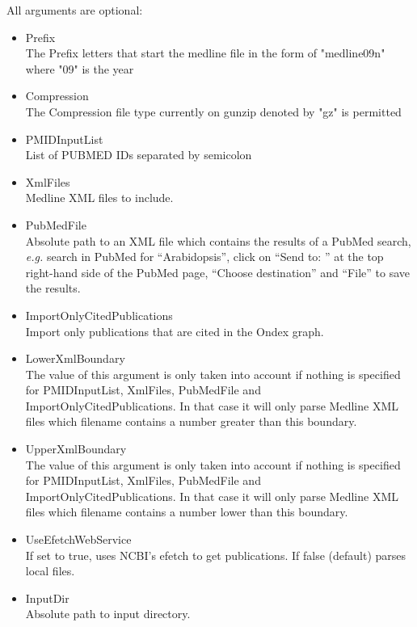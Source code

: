 All arguments are optional:
\begin{itemize}
  \item{Prefix}\\
  The Prefix letters that start the medline file in the form of "medline09n" where "09" is the year
  \item{Compression}\\
  The Compression file type currently on gunzip denoted by "gz" is permitted
  \item{PMIDInputList}\\
  List of PUBMED IDs separated by semicolon
  \item{XmlFiles}\\
  Medline XML files to include.
  \item{PubMedFile}\\
  Absolute path to an XML file which contains the results of a PubMed search, 
  {\it{e.g.}} search in PubMed for ``Arabidopsis'', click on ``Send to: '' at the top right-hand side of the PubMed page, 
  ``Choose destination'' and ``File'' to save the results.
  \item{ImportOnlyCitedPublications}\\
  Import only publications that are cited in the Ondex graph.
  \item{LowerXmlBoundary}\\
  The value of this argument is only taken into account if nothing is specified for PMIDInputList, XmlFiles, PubMedFile and ImportOnlyCitedPublications.
  In that case it will only parse Medline XML files which filename contains a number greater than this boundary.
  \item{UpperXmlBoundary}\\
  The value of this argument is only taken into account if nothing is specified for PMIDInputList, XmlFiles, PubMedFile and ImportOnlyCitedPublications.
  In that case it will only parse Medline XML files which filename contains a number lower than this boundary.
  \item{UseEfetchWebService}\\
  If set to true, uses NCBI's efetch to get publications. If false (default) parses local files.
  \item{InputDir}\\
  Absolute path to input directory.
\end{itemize}
    
